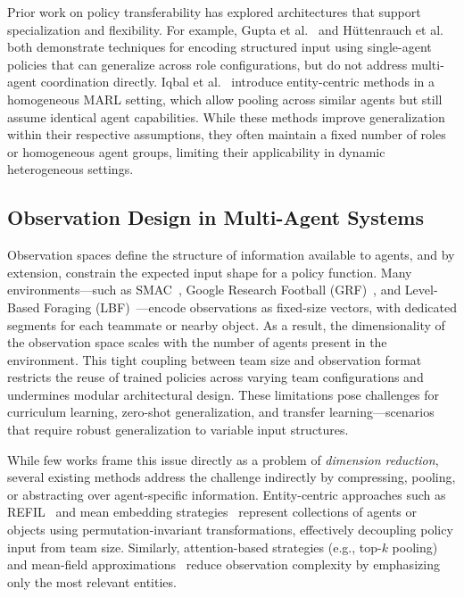 \documentclass{article}
\begin{document}
Prior work on policy transferability has explored architectures that support specialization 
and flexibility. For example, Gupta et al.~\cite{gupta2017a} and H{\"u}ttenrauch 
et al.~\cite{huttenrauch2019} both demonstrate techniques for encoding structured input 
using single-agent policies that can generalize across role configurations, but do not 
address multi-agent coordination directly. Iqbal et al.~\cite{iqbal2021} introduce 
entity-centric methods in a homogeneous MARL setting, which allow pooling across similar 
agents but still assume identical agent capabilities. While these methods improve 
generalization within their respective assumptions, they often maintain a fixed number of roles 
or homogeneous agent groups, limiting their applicability in dynamic heterogeneous settings.


\subsection{Observation Design in Multi-Agent Systems}
\label{sec:related_work-observation_design}

Observation spaces define the structure of information available to agents, 
and by extension, constrain the expected input shape for a policy function.
Many environments—such as SMAC~\cite{samvelyan2019}, 
Google Research Football (GRF)~\cite{kurach2020}, 
and Level-Based Foraging (LBF)~\cite{papoudakis2021}—encode observations as fixed-size vectors, 
with dedicated segments for each teammate or nearby object. 
As a result, the dimensionality of the observation space scales with the 
number of agents present in the environment. 
This tight coupling between team size and observation format restricts the 
reuse of trained policies across varying team configurations and undermines 
modular architectural design. These limitations pose challenges for curriculum learning, 
zero-shot generalization, and transfer learning—scenarios that require robust generalization 
to variable input structures.

While few works frame this issue directly as a problem of \textit{dimension reduction}, 
several existing methods address the challenge indirectly by compressing, pooling, 
or abstracting over agent-specific information. Entity-centric approaches such as 
REFIL~\cite{iqbal2021} and mean embedding strategies~\cite{huttenrauch2019} represent 
collections of agents or objects using permutation-invariant transformations, effectively 
decoupling policy input from team size. Similarly, attention-based strategies 
(e.g., top-$k$ pooling) and mean-field approximations~\cite{yang2021a} reduce 
observation complexity by emphasizing only the most relevant entities.
\end{document}
